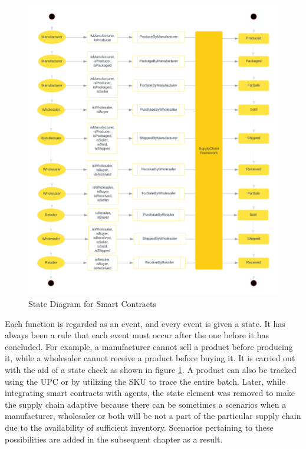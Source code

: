 \vspace{.5cm}

   \begin{figure}[h]
    \centering
      \includegraphics[width=12cm]{includes/figures/State diagram.png} 
      \caption{State Diagram for Smart Contracts}
      \label{State Diagram}
    \end{figure}

\vspace{.5cm}

Each function is regarded as an event, and every event is given a state. It has always been a rule that each event must occur after the one before it has concluded. For example, a manufacturer cannot sell a product before producing it, while a wholesaler cannot receive a product before buying it. It is carried out with the aid of a state check as shown in figure \ref{State Diagram}. A product can also be tracked using the \ac{UPC} or by utilizing the \ac{SKU} to trace the entire batch. Later, while integrating smart contracts with agents, the state element was removed to make the supply chain adaptive because there can be sometimes a scenarios when a manufacturer, wholesaler or both will be not a part of the particular supply chain due to the availability of sufficient inventory. Scenarios pertaining to these possibilities are added in the subsequent chapter as a result.

